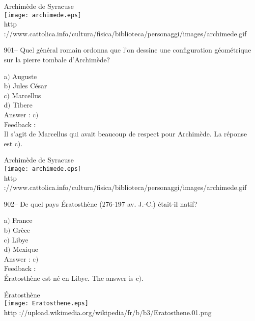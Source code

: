 \documentclass[letterpaper, 12pt]{article}
\begin{document}
        \begin{center}
        Archim\`ede de Syracuse\\
    \texttt{[image: archimede.eps]}\\
        {\footnotesize http
://www.cattolica.info/cultura/fisica/biblioteca/personaggi/images/archimede.gif}
    \end{center}

901-- Quel g\'en\'eral romain ordonna que l'on dessine une
configuration g\'eom\'etrique sur la pierre tombale d'Archim\`ede?

a$)$ Auguste \\
b$)$ Jules C\'esar \\
c$)$ Marcellus \\
d$)$ Tibere \\

Answer : c$)$\\

Feedback : \\
Il s'agit de Marcellus qui avait beaucoup de respect pour Archim\`ede. La
r\'eponse est c$)$.\\

        \begin{center}
        Archim\`ede de Syracuse\\
    \texttt{[image: archimede.eps]}\\
        {\footnotesize http
://www.cattolica.info/cultura/fisica/biblioteca/personaggi/images/archimede.gif}
    \end{center}

902-- De quel pays \'Eratosth\`ene (276-197 av. J.-C.) \'etait-il
natif?

a$)$ France  \\
b$)$ Gr\`ece  \\
c$)$ Libye \\
d$)$ Mexique \\

Answer : c$)$\\

Feedback : \\
\'Eratosth\`ene est n\'e en Libye. The answer is c$)$.\\

        \begin{center}
        \'Eratosth\`ene\\
    \texttt{[image: Eratosthene.eps]}\\
        {\footnotesize http
://upload.wikimedia.org/wikipedia/fr/b/b3/Eratosthene.01.png}
    \end{center}
\end{document}
